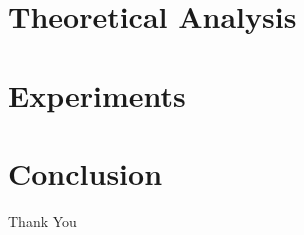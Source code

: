 \documentclass{beamer}
\begin{document}
\section{Theoretical Analysis}


\section{Experiments}


\section{Conclusion}


% 
%



\begin{frame}
\Huge{\centerline{Thank You}}
\end{frame}

\end{document}

